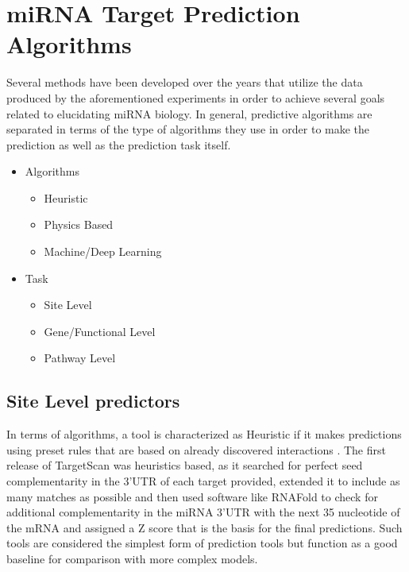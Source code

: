 \documentclass[en,ack]{dimscthesis}
\begin{document}
\section{miRNA Target Prediction Algorithms} \label{miRNA Target Prediction Algorithms}
\par Several methods have been developed over the years that utilize the data produced by the aforementioned experiments in order to achieve several goals related to elucidating miRNA biology. In general, predictive algorithms are separated in terms of the type of algorithms they use in order to make the prediction as well as the prediction task itself.
\begin{itemize}
	\item Algorithms
	\begin{itemize}
		\item Heuristic 
		\item Physics Based 
		\item Machine/Deep Learning 
	\end{itemize}
	\item Task
	\begin{itemize}
		\item Site Level
		\item Gene/Functional Level
		\item Pathway Level
	\end{itemize}
\end{itemize}

\subsection{Site Level predictors}
\par In terms of algorithms, a tool is characterized as Heuristic if it makes predictions using preset rules that are based on already discovered interactions \parencite{lewisPredictionMammalianMicroRNA2003,lewisConservedSeedPairing2005}. The first release of TargetScan was heuristics based, as it searched for perfect seed complementarity in the 3'UTR of each target provided, extended it to include as many matches as possible and then used software like RNAFold to check for additional complementarity in the miRNA 3'UTR with the next 35 nucleotide of the mRNA \parencite{hofackerFastFoldingComparison1994} and assigned a Z score that is the basis for the final predictions. Such tools are considered the simplest form of prediction tools but function as a good baseline for comparison with more complex models. 
\end{document}
